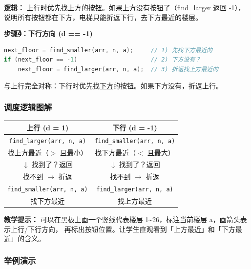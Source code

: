 \textbf{逻辑：} 上行时优先找\underline{上方}的按钮。如果上方没有按钮了（find\_larger 返回 -1），
说明所有按钮都在下方，电梯只能折返下行，去下方最近的楼层。

\vspace{0.5em}
\textbf{步骤\textcircled{4}：下行方向 (d == -1)}

\begin{lstlisting}[language=C]
next_floor = find_smaller(arr, n, a);     // 1) 先找下方最近的
if (next_floor == -1)                     // 2) 下方没有？
    next_floor = find_larger(arr, n, a);  // 3) 折返找上方最近的
\end{lstlisting}

与上行完全对称：下行时优先找\underline{下方}的按钮。如果下方没有，折返上行。

\subsubsection{调度逻辑图解}

\begin{center}
\begin{tabular}{@{}c|c@{}}
    \toprule
    \textbf{上行 (d = 1)} & \textbf{下行 (d = -1)} \\
    \midrule
    \texttt{find\_larger(arr, n, a)} & \texttt{find\_smaller(arr, n, a)} \\
    找上方最近（$>$ 且最小）              & 找下方最近（$<$ 且最大）                   \\
    $\downarrow$ 找到了？返回                       & $\downarrow$ 找到了？返回                           \\
    找不到 $\rightarrow$ 折返                     & 找不到 $\rightarrow$ 折返                         \\
    \texttt{find\_smaller(arr, n, a)} & \texttt{find\_larger(arr, n, a)} \\
    找下方最近                        & 找上方最近                            \\
    \bottomrule
\end{tabular}
\end{center}

\textbf{教学提示：} 可以在黑板上画一个竖线代表楼层 1\~{}26，标注当前楼层 a，画箭头表示上行/下行方向，
再标出按钮位置。让学生直观看到「上方最近」和「下方最近」的含义。

\subsubsection{举例演示}

